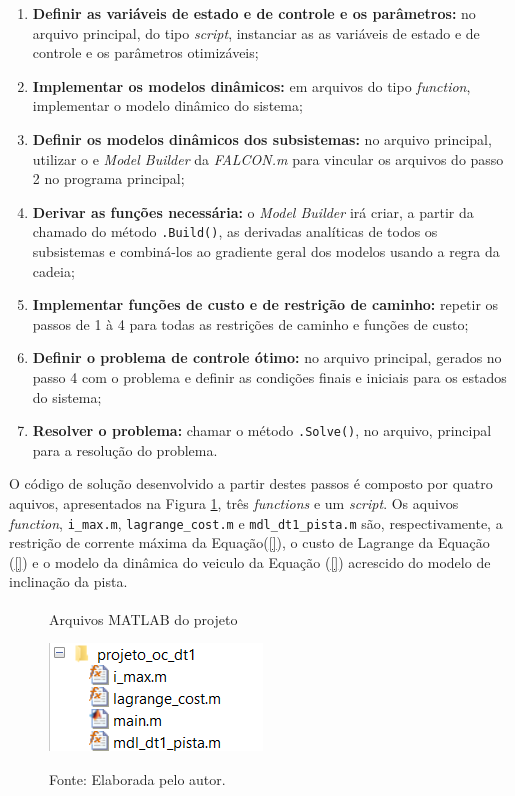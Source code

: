 \begin{enumerate}
    \item \textbf{Definir as variáveis de estado e de controle e os parâmetros:} no arquivo principal, do tipo \textit{script}, instanciar as  as variáveis de estado e de controle e os parâmetros otimizáveis;
    \item \textbf{Implementar os modelos dinâmicos:} em arquivos do tipo \textit{function}, implementar o modelo dinâmico do sistema; 
    \item \textbf{Definir os modelos dinâmicos dos subsistemas:} no arquivo principal, utilizar o e \textit{Model Builder} da \textit{FALCON.m} para vincular os arquivos do passo 2 no programa principal;
    \item \textbf{Derivar as funções necessária:} o \textit{Model Builder} irá criar, a partir da chamado do método \lstinline[style=Matlab-editor]{.Build()}, as derivadas analíticas de todos os subsistemas e combiná-los ao gradiente geral dos modelos usando a regra da cadeia;
    \item \textbf{Implementar funções de custo e de restrição de caminho:} repetir os passos de 1 à 4 para todas as restrições de caminho e funções de custo;
    \item \textbf{Definir o problema de controle ótimo:}  no arquivo principal, gerados no passo 4 com o problema e definir as condições finais e iniciais para os estados do sistema;
    \item \textbf{Resolver o problema:} chamar o método \lstinline[style=Matlab-editor]{.Solve()}, no arquivo, principal para a resolução do problema.
\end{enumerate}


O código de solução desenvolvido a partir destes passos é composto por quatro aquivos, apresentados na Figura \ref{fig:matlab_files}, três \textit{functions} e um \textit{script}. Os aquivos \textit{function}, \lstinline[style=Matlab-editor]{i_max.m},
\lstinline[style=Matlab-editor]{lagrange_cost.m} e \lstinline[style=Matlab-editor]{mdl_dt1_pista.m} são, respectivamente, 
a restrição de corrente máxima da Equação(\ref{}), o custo de Lagrange da Equação (\ref{}) e o modelo da dinâmica do veiculo da Equação (\ref{}) acrescido do modelo de inclinação da pista.

\begin{figure}[h]
    \centering
    \caption{Arquivos MATLAB\textsuperscript{\textregistered} do projeto}
    \includegraphics[]{Metodologia/Figuras/matlab_files.png}
    \label{fig:matlab_files}
    \caption*{\footnotesize{Fonte: Elaborada pelo autor.}}
\end{figure}


